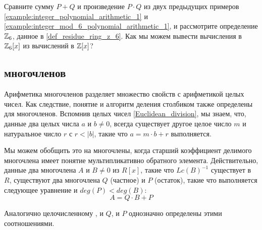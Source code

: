 \begin{exercise}
Сравните сумму $P+Q$ и произведение $P\cdot Q$ из двух предыдущих примеров \ref{example:integer_polynomial_arithmetic_1} и \ref{example:integer_mod_6_polynomial_arithmetic_1}, и рассмотрите определение $\mathbb{Z}_6$, данное в \examplename{} \ref{def_residue_ring_z_6}. Как мы можем вывести вычисления в $\mathbb{Z}_6[x]$ из вычислений в $\mathbb{Z}[x]$?
\end{exercise}
\subsection{ многочленов}
Арифметика многочленов разделяет множество свойств с арифметикой целых чисел. Как следствие, понятие  и алгоритм деления столбиком также определены для многочленов. Вспомнив  целых чисел \ref{Euclidean_division}, мы знаем, что, данные два целых числа $a$ и $b\neq 0$, всегда существует другое целое число $m$ и натуральное число $r$ с $r<|b|$, такие что $a = m\cdot b +r$ выполняется.

Мы можем обобщить это на многочлены, когда старший коэффициент делимого многочлена имеет понятие мультипликативно обратного элемента. Действительно, данные два многочлена $A$ и $B\neq 0$ из $R[x]$, такие что $Lc(B)^{-1}$ существует в $R$, существуют два многочлена $Q$ (частное) и $P$ (остаток), такие что выполняется следующее уравнение и $deg(P) < deg(B)$:
\begin{equation}
\label{eq_polynomial_euclidean_division_notation}
	A = Q\cdot B + P
\end{equation}

Аналогично целочисленному , и $Q$, и $P$ однозначно определены этими соотношениями.

